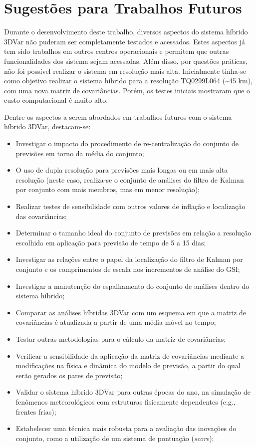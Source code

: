 \section{Sugestões para Trabalhos Futuros}

Durante o desenvolvimento deste trabalho, diversos aspectos do sistema híbrido 3DVar não puderam ser completamente testados e acessados. Estes aspectos já tem sido trabalhos em outros centros operacionais e permitem que outras funcionalidades dos sistema sejam acessadas. Além disso, por questões práticas, não foi possível realizar o sistema em resolução mais alta. Inicialmente tinha-se como objetivo realizar o sistema híbrido para a resolução TQ0299L064 (\textasciitilde{}45 km), com uma nova matriz de covariâncias. Porém, os testes iniciais mostraram que o custo computacional é muito alto.

Dentre os aspectos a serem abordados em trabalhos futuros com o sistema híbrido 3DVar, destacam-se:

\begin{itemize}
    \item Investigar o impacto do procedimento de re-centralização do conjunto de previsões em torno da média do conjunto; 
    \item O uso de dupla resolução para previsões mais longas ou em mais alta resolução (neste caso, realiza-se o conjunto de análises do filtro de Kalman por conjunto com mais membros, mas em menor resolução);
    \item Realizar testes de sensibilidade com outros valores de inflação e localização das covariâncias;
    \item Determinar o tamanho ideal do conjunto de previsões em relação a resolução escolhida em aplicação para previsão de tempo de 5 a 15 dias;
    \item Investigar as relações entre o papel da localização do filtro de Kalman por conjunto e os comprimentos de escala nos incrementos de análise do GSI;
    \item Investigar a manutenção do espalhamento do conjunto de análises dentro do sistema híbrido;
    \item Comparar as análises híbridas 3DVar com um esquema em que a matriz de covariâncias é atualizada a partir de uma média móvel no tempo;
    \item Testar outras metodologias para o cálculo da matriz de covariâncias;
    \item Verificar a sensibilidade da aplicação da matriz de covariâncias mediante a modificações na física e dinâmica do modelo de previsão, a partir do qual serão gerados os pares de previsão;
    \item Validar o sistema híbrido 3DVar para outras épocas do ano, na simulação de fenômenos meteorológicos com estruturas fisicamente dependentes (e.g., frentes frias);
    \item Estabelecer uma técnica mais robusta para a avaliação das inovações do conjunto, como a utilização de um sistema de pontuação (\textit{score});
\end{itemize}